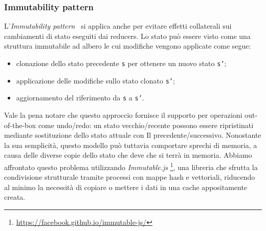 \subsubsection*{Immutability pattern}
L'\emph{Immutability pattern}~\cite{immutability} si applica anche per evitare effetti collaterali sui cambiamenti di stato
eseguiti dai reducers. Lo stato può essere visto come una struttura immutabile ad albero le cui modifiche vengono applicate come segue:
\begin{itemize}
  \item clonazione dello stato precedente \texttt{s} per ottenere un nuovo stato \texttt{s'};
  \item applicazione delle modifiche sullo stato clonato \texttt{s'};
  \item aggiornamento del riferimento da \texttt{s} a \texttt{s'}.
\end{itemize}
Vale la pena notare che questo approccio fornisce il supporto per operazioni out-of-the-box come undo/redo:
un stato vecchio/recente possono essere ripristinati mediante sostituzione dello stato attuale con Il precedente/successivo.
Nonostante la sua semplicità, questo modello può tuttavia comportare sprechi di memoria, a causa delle diverse copie dello
stato che deve che si terrà in memoria. Abbiamo affrontato questo problema utilizzando \emph{Immutable.js}
\footnote{\url{https://facebook.github.io/immutable-js/}}, una libreria che sfrutta la condivisione strutturale tramite
processi con mappe hash e vettoriali, riducendo al minimo la necessità di copiare o mettere i dati in una cache appositamente creata.
\newpage
